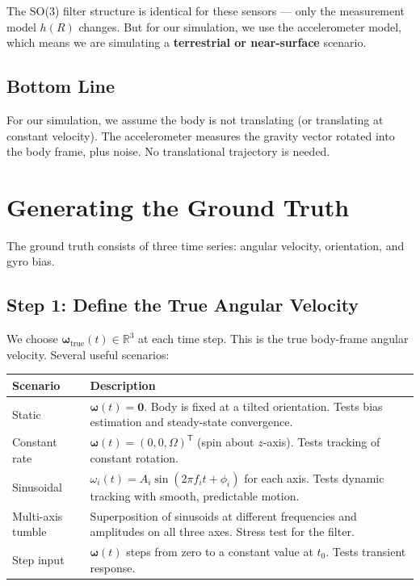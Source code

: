 \documentclass[11pt,letterpaper]{article}
\newcommand{\R}{\mathbb{R}}
\begin{document}
The SO(3) filter structure is identical for these sensors --- only
the measurement model $h(R)$ changes.  But for our simulation, we
use the accelerometer model, which means we are simulating a
\textbf{terrestrial or near-surface} scenario.

\subsection{Bottom Line}

For our simulation, we assume the body is not translating (or
translating at constant velocity).  The accelerometer measures the
gravity vector rotated into the body frame, plus noise.  No
translational trajectory is needed.

\section{Generating the Ground Truth}

The ground truth consists of three time series: angular velocity,
orientation, and gyro bias.

\subsection{Step 1: Define the True Angular Velocity}

We choose $\bm{\omega}_{\mathrm{true}}(t) \in \R^{3}$ at each
time step.  This is the true body-frame angular velocity.  Several
useful scenarios:

\begin{center}
\begin{tabular}{lp{7cm}}
\toprule
\textbf{Scenario} & \textbf{Description} \\
\midrule
Static &
  $\bm{\omega}(t) = \mathbf{0}$.  Body is fixed at a tilted
  orientation.  Tests bias estimation and steady-state convergence.
  \\[4pt]
Constant rate &
  $\bm{\omega}(t) = (0, 0, \Omega)^{\mathsf{T}}$ (spin about
  $z$-axis).  Tests tracking of constant rotation.
  \\[4pt]
Sinusoidal &
  $\omega_i(t) = A_i \sin(2\pi f_i t + \phi_i)$ for each axis.
  Tests dynamic tracking with smooth, predictable motion.
  \\[4pt]
Multi-axis tumble &
  Superposition of sinusoids at different frequencies and amplitudes
  on all three axes.  Stress test for the filter.
  \\[4pt]
Step input &
  $\bm{\omega}(t)$ steps from zero to a constant value at $t_0$.
  Tests transient response.
  \\
\bottomrule
\end{tabular}
\end{center}
\end{document}
